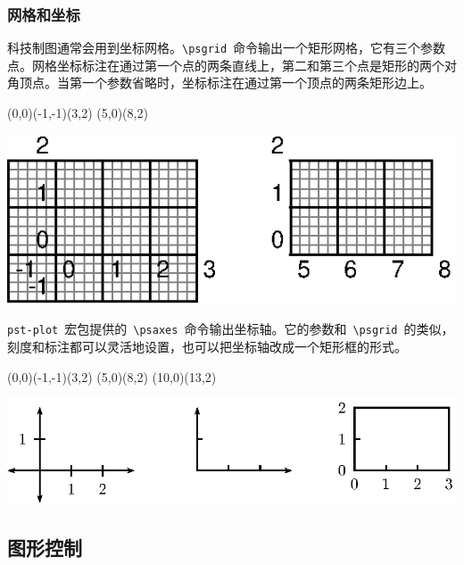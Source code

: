\subsubsection{网格和坐标}
科技制图通常会用到坐标网格。\verb|\psgrid|~命令输出一个矩形网格，它有三个参数点。网格坐标标注在通过第一个点的两条直线上，第二和第三个点是矩形的两个对角顶点。当第一个参数省略时，坐标标注在通过第一个顶点的两条矩形边上。

\begin{code}
\psgrid(0,0)(-1,-1)(3,2)
\psgrid(5,0)(8,2)
\end{code}
\begin{out}
\includegraphics{examples/pst_grid.eps}
\end{out}

\verb|pst-plot|~宏包提供的~\verb|\psaxes|~命令输出坐标轴。它的参数和~\verb|\psgrid|~的类似，刻度和标注都可以灵活地设置，也可以把坐标轴改成一个矩形框的形式。
\begin{code}
\psaxes{<->}(0,0)(-1,-1)(3,2)
\psaxes[tickstyle=top,labels=none]{->}(5,0)(8,2)
\psaxes[axesstyle=frame,tickstyle=top]{->}(10,0)(13,2)
\end{code}
\begin{out}
\includegraphics{examples/pst_axis.eps}
\end{out}

\subsection{图形控制}
